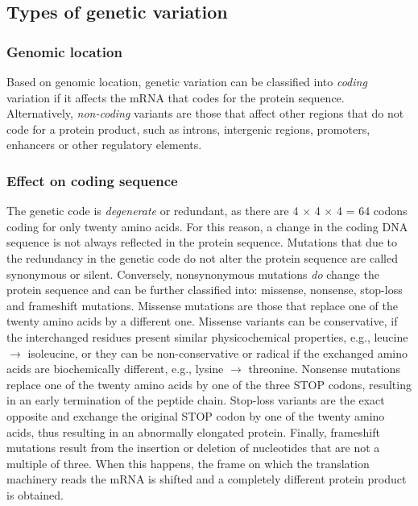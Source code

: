 \subsection{Types of genetic variation}

\subsubsection{Genomic location}

Based on genomic location, genetic variation can be classified into \textit{coding} variation if it affects the mRNA that codes for the protein sequence. Alternatively, \textit{non-coding} variants are those that affect other regions that do not code for a protein product, such as introns, intergenic regions, promoters, enhancers or other regulatory elements.

\subsubsection{Effect on coding sequence}

The genetic code is \textit{degenerate} or redundant, as there are 4 $\times$ 4 $\times$ 4 = 64 codons coding for only twenty amino acids. For this reason, a change in the coding DNA sequence is not always reflected in the protein sequence. Mutations that due to the redundancy in the genetic code do not alter the protein sequence are called synonymous or silent. Conversely, nonsynonymous mutations \textit{do} change the protein sequence and can be further classified into: missense, nonsense, stop-loss and frameshift mutations. Missense mutations are those that replace one of the twenty amino acids by a different one. Missense variants can be conservative, if the interchanged residues present similar physicochemical properties, e.g., leucine $\rightarrow$ isoleucine, or they can be non-conservative or radical if the exchanged amino acids are biochemically different, e.g., lysine $\rightarrow$ threonine. Nonsense mutations replace one of the twenty amino acids by one of the three STOP codons, resulting in an early termination of the peptide chain. Stop-loss variants are the exact opposite and exchange the original STOP codon by one of the twenty amino acids, thus resulting in an abnormally elongated protein. Finally, frameshift mutations result from the insertion or deletion of nucleotides that are not a multiple of three. When this happens, the frame on which the translation machinery reads the mRNA is shifted and a completely different protein product is obtained.

